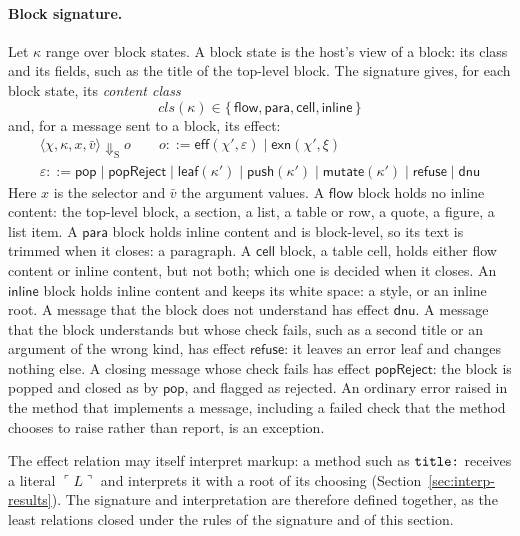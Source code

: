 \documentclass[11pt]{article}
\numberwithin{equation}{section}
\newcommand{\kw}[1]{\ensuremath{\mathsf{#1}}}
\newcommand{\str}[1]{\ensuremath{\text{\texttt{#1}}}}
\begin{document}
\paragraph{Block signature.}
Let $\kappa$ range over block states.  A block state is the host's view of
a block: its class and its fields, such as the title of the top-level
block.  The signature gives, for each block state, its \emph{content
class}
\begin{equation}\label{eq:content-class}
\mathit{cls}(\kappa) \in \{\, \kw{flow}, \kw{para}, \kw{cell}, \kw{inline} \,\}
\end{equation}
and, for a message sent to a block, its effect:
\begin{equation}\label{eq:block-signature}
\begin{gathered}
\langle \chi, \kappa, x, \bar v \rangle \Downarrow_{\mathrm{S}} o
\qquad
o ::= \kw{eff}(\chi', \varepsilon) \mid \kw{exn}(\chi', \xi)
\\
\varepsilon ::= \kw{pop} \mid \kw{popReject} \mid \kw{leaf}(\kappa')
  \mid \kw{push}(\kappa') \mid \kw{mutate}(\kappa') \mid \kw{refuse}
  \mid \kw{dnu}
\end{gathered}
\end{equation}
Here $x$ is the selector and $\bar v$ the argument values.  A $\kw{flow}$
block holds no inline content: the top-level block, a section, a list, a
table or row, a quote, a figure, a list item.  A $\kw{para}$ block holds
inline content and is block-level, so its text is trimmed when it closes: a
paragraph.  A $\kw{cell}$ block, a table cell, holds either flow content or
inline content, but not both; which one is decided when it closes.  An
$\kw{inline}$ block holds inline content and keeps its white space: a
style, or an inline root.  A message that the block does not understand has
effect $\kw{dnu}$.  A message that the block understands but whose check
fails, such as a second title or an argument of the wrong kind, has effect
$\kw{refuse}$: it leaves an error leaf and changes nothing else.  A closing
message whose check fails has effect $\kw{popReject}$: the block is popped
and closed as by $\kw{pop}$, and flagged as rejected.  An ordinary error
raised in the method that implements a message, including a failed check
that the method chooses to raise rather than report, is an exception.

The effect relation may itself interpret markup: a method such as
$\str{title:}$ receives a literal $\ulcorner L \urcorner$ and interprets it
with a root of its choosing (Section~\ref{sec:interp-results}).  The
signature and interpretation are therefore defined together, as the least
relations closed under the rules of the signature and of this section.
\end{document}
